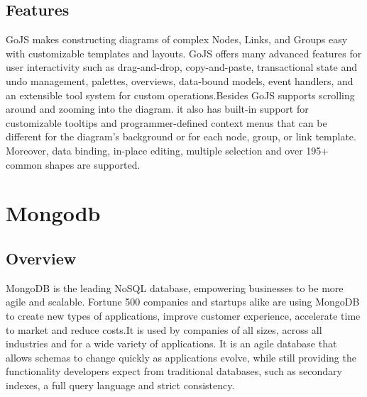 \documentclass[14pt,a4paper]{extreport}
\begin{document}
		\subsection{Features}
			GoJS makes constructing diagrams of complex Nodes, Links, and Groups easy with customizable templates and layouts. GoJS offers many advanced features for user interactivity such as drag-and-drop, copy-and-paste, transactional state and undo management, palettes, overviews, data-bound models, event handlers, and an extensible tool system for custom operations.Besides GoJS supports scrolling around and zooming into the diagram. it also has built-in support for customizable tooltips and programmer-defined context menus that can be different for the diagram's background or for each node, group, or link template. Moreover, data binding, in-place editing, multiple selection and over 195+ common shapes are supported.
			
	\section{Mongodb}
		\subsection{Overview}
		MongoDB is the leading NoSQL database, empowering businesses to be more agile and scalable. Fortune 500 companies and startups alike are using MongoDB to create new types of applications, improve customer experience, accelerate time to market and reduce costs.It is used by companies of all sizes, across all industries and for a wide variety of applications. It is an agile database that allows schemas to change quickly as applications evolve, while still providing the functionality developers expect from traditional databases, such as secondary indexes, a full query language and strict consistency.
		
\end{document}

